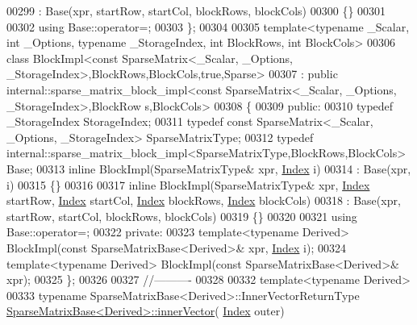 \begin{DoxyCode}
00299     : Base(xpr, startRow, startCol, blockRows, blockCols)
00300   \{\}
00301 
00302   \textcolor{keyword}{using} Base::operator=;
00303 \};
00304 
00305 \textcolor{keyword}{template}<\textcolor{keyword}{typename} \_Scalar, \textcolor{keywordtype}{int} \_Options, \textcolor{keyword}{typename} \_StorageIndex, \textcolor{keywordtype}{int} BlockRows, \textcolor{keywordtype}{int} BlockCols>
00306 \textcolor{keyword}{class }BlockImpl<const SparseMatrix<\_Scalar, \_Options, \_StorageIndex>,BlockRows,BlockCols,true,Sparse>
00307   : \textcolor{keyword}{public} internal::sparse\_matrix\_block\_impl<const SparseMatrix<\_Scalar, \_Options, \_StorageIndex>,BlockRow
      s,BlockCols>
00308 \{
00309 \textcolor{keyword}{public}:
00310   \textcolor{keyword}{typedef} \_StorageIndex StorageIndex;
00311   \textcolor{keyword}{typedef} \textcolor{keyword}{const} SparseMatrix<\_Scalar, \_Options, \_StorageIndex> SparseMatrixType;
00312   \textcolor{keyword}{typedef} internal::sparse\_matrix\_block\_impl<SparseMatrixType,BlockRows,BlockCols> Base;
00313   \textcolor{keyword}{inline} BlockImpl(SparseMatrixType& xpr, \hyperlink{namespace_eigen_a62e77e0933482dafde8fe197d9a2cfde}{Index} i)
00314     : Base(xpr, i)
00315   \{\}
00316 
00317   \textcolor{keyword}{inline} BlockImpl(SparseMatrixType& xpr, \hyperlink{namespace_eigen_a62e77e0933482dafde8fe197d9a2cfde}{Index} startRow, \hyperlink{namespace_eigen_a62e77e0933482dafde8fe197d9a2cfde}{Index} startCol, 
      \hyperlink{namespace_eigen_a62e77e0933482dafde8fe197d9a2cfde}{Index} blockRows, \hyperlink{namespace_eigen_a62e77e0933482dafde8fe197d9a2cfde}{Index} blockCols)
00318     : Base(xpr, startRow, startCol, blockRows, blockCols)
00319   \{\}
00320 
00321   \textcolor{keyword}{using} Base::operator=;
00322 \textcolor{keyword}{private}:
00323   \textcolor{keyword}{template}<\textcolor{keyword}{typename} Derived> BlockImpl(\textcolor{keyword}{const} SparseMatrixBase<Derived>& xpr, 
      \hyperlink{namespace_eigen_a62e77e0933482dafde8fe197d9a2cfde}{Index} i);
00324   \textcolor{keyword}{template}<\textcolor{keyword}{typename} Derived> BlockImpl(\textcolor{keyword}{const} SparseMatrixBase<Derived>& xpr);
00325 \};
00326 
00327 \textcolor{comment}{//----------}
00328 
00332 \textcolor{keyword}{template}<\textcolor{keyword}{typename} Derived>
00333 \textcolor{keyword}{typename} SparseMatrixBase<Derived>::InnerVectorReturnType 
      \hyperlink{group___sparse_core___module_a65aaf3b50d205011e2bfa0de24756cce}{SparseMatrixBase<Derived>::innerVector}(
      \hyperlink{namespace_eigen_a62e77e0933482dafde8fe197d9a2cfde}{Index} outer)

\end{DoxyCode}
